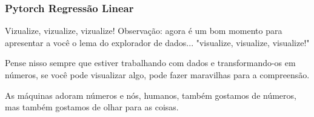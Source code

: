 \documentclass{beamer}
\begin{document}
\begin{frame}
	\frametitle{Pytorch Regressão Linear}
	\begin{block}{Vizualize, vizualize, vizualize!}
		Observação: agora é um bom momento para apresentar a você o lema do explorador de dados... "visualize, visualize, visualize!"
		
		Pense nisso sempre que estiver trabalhando com dados e transformando-os em números, se você pode visualizar algo, pode fazer maravilhas para a compreensão.
		
		As máquinas adoram números e nós, humanos, também gostamos de números, mas também gostamos de olhar para as coisas.
	\end{block}
\end{frame}
\end{document}
